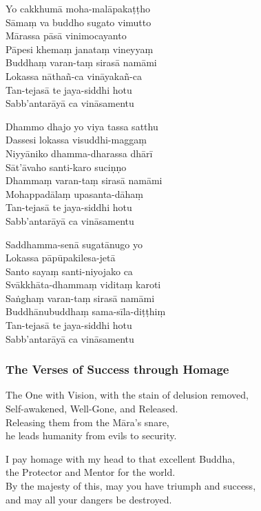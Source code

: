 \begin{paritta}
Yo cakkhumā moha-malāpakaṭṭho\\
Sāmaṃ va buddho sugato vimutto\\
Mārassa pāsā vinimocayanto\\
Pāpesi khemaṃ janataṃ vineyyaṃ\\
Buddhaṃ varan-taṃ sirasā namāmi\\
Lokassa nāthañ-ca vināyakañ-ca\\
Tan-tejasā te jaya-siddhi hotu\\
Sabb'antarāyā ca vināsamentu

Dhammo dhajo yo viya tassa satthu\\
Dassesi lokassa visuddhi-maggaṃ\\
Niyyāniko dhamma-dharassa dhārī\\
Sāt'āvaho santi-karo suciṇṇo\\
Dhammaṃ varan-taṃ sirasā namāmi\\
Mohappadālaṃ upasanta-dāhaṃ\\
Tan-tejasā te jaya-siddhi hotu\\
Sabb'antarāyā ca vināsamentu

Saddhamma-senā sugatānugo yo\\
Lokassa pāpūpakilesa-jetā\\
Santo sayaṃ santi-niyojako ca\\
Svākkhāta-dhammaṃ viditaṃ karoti\\
Saṅghaṃ varan-taṃ sirasā namāmi\\
Buddhānubuddhaṃ sama-sīla-diṭṭhiṃ\\
Tan-tejasā te jaya-siddhi hotu\\
Sabb'antarāyā ca vināsamentu
\end{paritta}

\subsubsection{The Verses of Success through Homage}


The One with Vision, with the stain of delusion removed,\\
Self-awakened, Well-Gone, and Released.\\
Releasing them from the Māra's snare,\\
he leads humanity from evils to security.

\clearpage

I pay homage with my head to that excellent Buddha,\\
the Protector and Mentor for the world.\\
By the majesty of this, may you have triumph and success,\\
and may all your dangers be destroyed.

